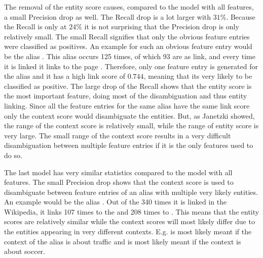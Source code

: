 The removal of the entity score causes, compared to the model with all features, a small Precision drop as well. The Recall drop is a lot larger with $31\%$. Because the Recall is only at $24\%$ it is not surprising that the Precision drop is only relatively small. The small Recall signifies that only the obvious feature entries were classified as positives. An example for such an obvious feature entry would be the alias . This alias occurs 125 times, of which 93 are as link, and every time it is linked it links to the page . Therefore, only one feature entry is generated for the alias and it has a high link score of $0.744$, meaning that its very likely to be classified as positive. The large drop of the Recall shows that the entity score is the most important feature, doing most of the disambiguation and thus entity linking. Since all the feature entries for the same alias have the same link score only the context score would disambiguate the entities. But, as Janetzki \cite{janetzki} showed, the range of the context score is relatively small, while the range of entity score is very large. The small range of the context score results in a very difficult disambiguation between multiple feature entries if it is the only features used to do so.\par
The last model has very similar statistics compared to the model with all features. The small Precision drop shows that the context score is used to disambiguate between feature entries of an alias with multiple very likely entities. An example would be the alias . Out of the 340 times it is linked in the Wikipedia, it links 107 times to the  and 208 times to . This means that the entity scores are relatively similar while the context scores will most likely differ due to the entities appearing in very different contexts. E.g.  is most likely meant if the context of the alias is about traffic and  is most likely meant if the context is about soccer.\par
